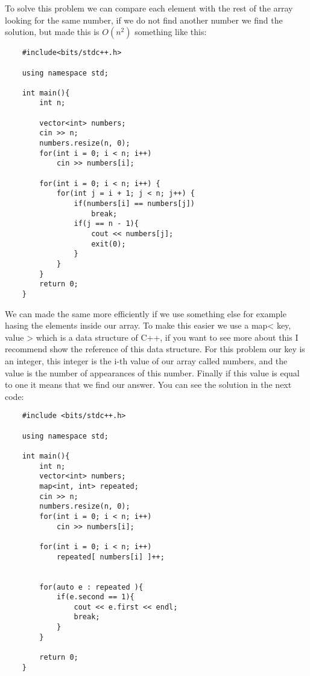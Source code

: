 To solve this problem we can compare each element with the rest of the array looking for the same number, if we do not find another number we find the solution, but made this is $O(n^{2})$ something like this:

\begin{lstlisting}
    #include<bits/stdc++.h>

    using namespace std;

    int main(){
        int n;

        vector<int> numbers;
        cin >> n;
        numbers.resize(n, 0);
        for(int i = 0; i < n; i++)
            cin >> numbers[i];

        for(int i = 0; i < n; i++) {
            for(int j = i + 1; j < n; j++) {
                if(numbers[i] == numbers[j])
                    break;
                if(j == n - 1){
                    cout << numbers[j];
                    exit(0);
                }
            }
        }
        return 0;
    }
\end{lstlisting}

We can made the same more efficiently if we use something else for example hasing the elements inside our array. To make this easier we use a map< key, value > which is a data structure of C++, if you want to see more about this I recommend show the reference of this data structure.
For this problem our key is an integer, this integer is the i-th value of our array called numbers, and the value is the number of appearances of this number. Finally if this value is equal to one it means that we find our answer. You can see the solution in the next code:

\begin{lstlisting}
    #include <bits/stdc++.h>

    using namespace std;

    int main(){
        int n;
        vector<int> numbers;
        map<int, int> repeated;
        cin >> n;
        numbers.resize(n, 0);
        for(int i = 0; i < n; i++)
            cin >> numbers[i];

        for(int i = 0; i < n; i++)
            repeated[ numbers[i] ]++;
        
        
        for(auto e : repeated ){
            if(e.second == 1){
                cout << e.first << endl;
                break;
            }
        }
        
        return 0;
    }
\end{lstlisting}   